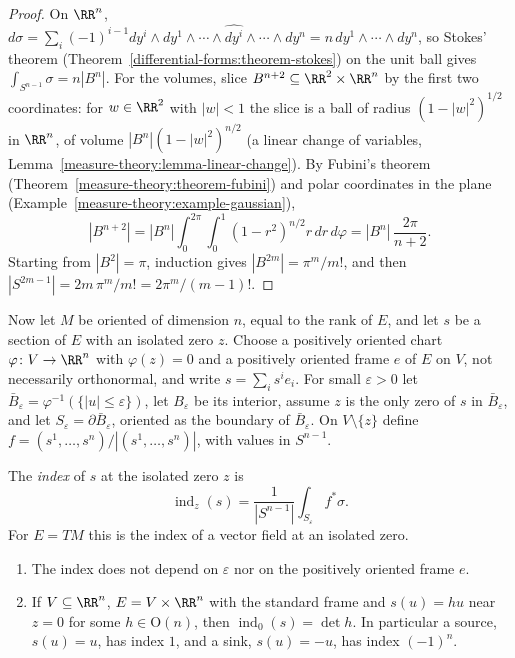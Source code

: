 \begin{proof}
On $\RR^n$, $d\sigma = \sum_i(-1)^{i-1}dy^i \wedge dy^1 \wedge \cdots \wedge \widehat{dy^i} \wedge \cdots \wedge dy^n = n\,dy^1 \wedge \cdots \wedge dy^n$, so Stokes' theorem
(Theorem~\ref{differential-forms:theorem-stokes}) on the unit ball gives $\int_{S^{n-1}}\sigma = n|B^n|$. For the volumes, slice $B^{n+2} \subseteq \RR^2 \times \RR^n$ by the first two
coordinates: for $w \in \RR^2$ with $|w| < 1$ the slice is a ball of radius $(1 - |w|^2)^{1/2}$ in $\RR^n$, of volume $|B^n|(1 - |w|^2)^{n/2}$ (a linear change of variables,
Lemma~\ref{measure-theory:lemma-linear-change}). By Fubini's theorem (Theorem~\ref{measure-theory:theorem-fubini}) and polar coordinates in the plane
(Example~\ref{measure-theory:example-gaussian}),
\[
|B^{n+2}| = |B^n|\int_0^{2\pi}\!\!\int_0^1(1 - r^2)^{n/2}r\,dr\,d\varphi = |B^n|\,\frac{2\pi}{n + 2} .
\]
Starting from $|B^2| = \pi$, induction gives $|B^{2m}| = \pi^m/m!$, and then $|S^{2m-1}| = 2m\,\pi^m/m! = 2\pi^m/(m-1)!$.
\end{proof}

Now let $M$ be oriented of dimension $n$, equal to the rank of $E$, and let $s$ be a section of $E$ with an isolated zero $z$. Choose a positively oriented chart $\varphi \colon V \to \RR^n$ with
$\varphi(z) = 0$ and a positively oriented frame $e$ of $E$ on $V$, not necessarily orthonormal, and write $s = \sum_is^ie_i$. For small $\varepsilon > 0$ let
$\bar B_\varepsilon = \varphi^{-1}(\{|u| \leq \varepsilon\})$, let $B_\varepsilon$ be its interior, assume $z$ is the only zero of $s$ in $\bar B_\varepsilon$, and let $S_\varepsilon = \partial\bar B_\varepsilon$, oriented as the boundary of
$\bar B_\varepsilon$. On $V \setminus \{z\}$ define $f = (s^1, \ldots, s^n)/|(s^1, \ldots, s^n)|$, with values in $S^{n-1}$.

\begin{definition}\label{characteristic-classes:definition-index}
The \emph{index} of $s$ at the isolated zero $z$ is
\[
\operatorname{ind}_z(s) = \frac{1}{|S^{n-1}|}\int_{S_\varepsilon}f^*\sigma .
\]
For $E = TM$ this is the index of a vector field at an isolated zero.
\end{definition}

\begin{lemma}\label{characteristic-classes:lemma-index}
\begin{enumerate}
\item The index does not depend on $\varepsilon$ nor on the positively oriented frame $e$.
\item If $V \subseteq \RR^n$, $E = V \times \RR^n$ with the standard frame and $s(u) = hu$ near $z = 0$ for some $h \in \mathrm{O}(n)$, then $\operatorname{ind}_0(s) = \det h$. In particular a
source, $s(u) = u$, has index $1$, and a sink, $s(u) = -u$, has index $(-1)^n$.
\end{enumerate}
\end{lemma}

